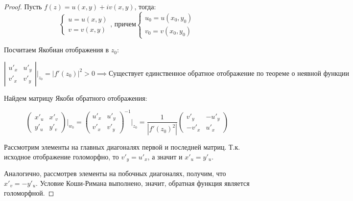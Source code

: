 \begin{proof}
    Пусть $f(z) = u(x, y) + iv(x, y)$, тогда:
    \begin{equation}
        \begin{cases}
            u = u(x, y)\\
            v = v(x, y)
        \end{cases}\text{, причем}
        \begin{cases}
            u_0 = u(x_0, y_0)\\
            v_0 = v(x_0, y_0)
        \end{cases}
    \end{equation}

    Посчитаем Якобиан отображения в $z_0$:

    \[
    \left|\begin{matrix} u'_x & u'_y \\ v'_x & v'_y \end{matrix}\right| \Bigg|_{z_0} = \left| f'(z_0) \right|^2 > 0 \implies \text{Существует единственное обратное отображение по теореме о неявной функции}
    \]

    Найдем матрицу Якоби обратного отображения:

    \[
    \begin{pmatrix} x'_u & x'_v \\ y'_u & y'_v \end{pmatrix} \Bigg|_{w_0} = \begin{pmatrix} u'_x & u'_y \\ v'_x & v'_y \end{pmatrix}^{-1} \Bigg|_{z_0} = \dfrac{1}{\left|f'(z_0)^2\right|}\begin{pmatrix} v'_y & -u'_y \\ -v'_x & u'_x \end{pmatrix}
    \]

    Рассмотрим элементы на главных диагоналях первой и последней матриц. Т.к. исходное отображение голоморфно, то $v'_y = u'_x$, а значит и $x'_u = y'_u$.

    Аналогично, рассмотрев элементы на побочных диагоналях, получим, что $x'_v = -y'_u$. Условие Коши-Римана выполнено, значит, обратная функция является голоморфной.
\end{proof}
